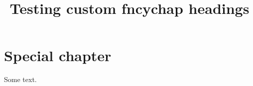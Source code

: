 \documentclass{report}
\title{Testing custom fncychap headings}
\begin{document}
\chapter{Special chapter}
Some text.
\end{document}

